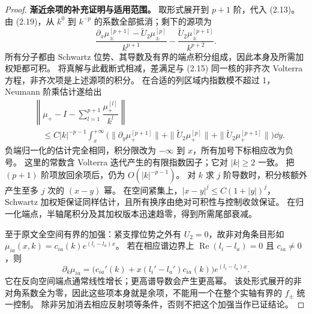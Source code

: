 \begin{proof}
\textbf{渐近余项的补充证明与适用范围。}
取形式展开到 $p+1$ 阶，代入 (2.13)。
由 (2.19)，从 $k^0$ 到 $k^{-p}$ 的系数全部抵消；剩下的源项为
\[
\dfrac{\partial_x\mu_\pm^{[p+1]}-\widetilde U_2\mu_\pm^{[p]}}{k^{p+1}}
-\dfrac{\widetilde U_2\mu_\pm^{[p+1]}}{k^{p+2}}.
\]
所有分子都由 Schwartz 位势、其导数及有界的端点积分组成，因此本身及所需加权矩都可积。
将真解与此截断式相减，差满足与 (2.15) 同一核的非齐次 Volterra 方程，非齐次项是上述源项的积分。
在合适的列区域内指数模不超过 1，Neumann 阶乘估计遂给出
\[
\begin{aligned}
&\left\|\mu_+-I-\sum\limits_{l=1}^{p+1}\dfrac{\mu_+^{[l]}}{k^l}\right\|\\
&\quad\le C|k|^{-p-1}\int_x^{+\infty}\bigl(
\|\partial_y\mu_+^{[p+1]}\|+
\|\widetilde U_2\mu_+^{[p]}\|+
\|\widetilde U_2\mu_+^{[p+1]}\|\bigr)\dd y.
\end{aligned}
\]
负端归一化的估计完全相同，积分限改为 $-\infty$ 到 $x$，所有加号下标相应改为负号。
这里的常数含 Volterra 迭代产生的有限指数因子；它对 $|k|\ge2$ 一致。
把 $(p+1)$ 阶项放回余项后，仍为 $O(|k|^{-p-1})$。
对 $k$ 求 $j$ 阶导数时，积分核额外产生至多 $j$ 次的 $(x-y)$ 幂。
在空间紧集上，$|x-y|^j\le C(1+|y|)^j$，Schwartz 加权矩保证同样估计，且所有换序由绝对可积性与控制收敛保证。
在归一化端点，半轴尾积分及其加权版本迅速趋零，得到所需尾部衰减。

至于原文全空间有界的加强：紧支撑位势之外有 $U_2=0$，故非对角条目形如
$\mu_{ia}(x,k)=c_{ia}(k)e^{(l_i-l_a)x}$。
若在相应谱边界上 $\operatorname{Re}(l_i-l_a)=0$ 且 $c_{ia}\ne0$，则
\[
\partial_k\mu_{ia}
=\bigl(c_{ia}'(k)+x(l_i'-l_a')c_{ia}(k)\bigr)e^{(l_i-l_a)x}.
\]
它在反向空间端点通常线性增长；更高谱导数会产生更高幂。
该处形式展开的非对角系数全为零，因此这些项本身就是余项，不能用一个在整个实轴有界的 $f_\pm$ 统一控制。
除非另加消去相应反射项等条件，否则不把这个加强当作已证结论。
\end{proof}


